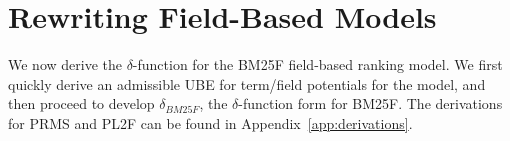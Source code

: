 \documentclass{sig-alternate}
\begin{document}
 
\section{Rewriting Field-Based Models} \label{sec:applied}
We now derive the $\delta$-function for the BM25F field-based ranking model. We first quickly derive an admissible UBE for term/field potentials for the model, and then proceed to develop $\delta_{BM25F}$, the $\delta$-function form for BM25F. The derivations for PRMS and PL2F can be found in Appendix~\ref{app:derivations}.
\end{document}
